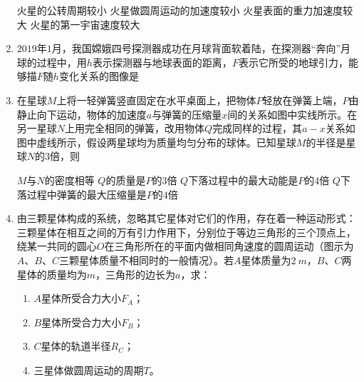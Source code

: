 \begin{enumerate}[leftmargin=0em]
\fourchoices
{火星的公转周期较小}
{火星做圆周运动的加速度较小}
{火星表面的重力加速度较大}
{火星的第一宇宙速度较大}
\item 
{}
$ 2019 $年$ 1 $月，我国嫦娥四号探测器成功在月球背面软着陆，在探测器“奔向”月球的过程中，用$ h $表示探测器与地球表面的距离，$ F $表示它所受的地球引力，能够描$ F $随$ h $变化关系的图像是  
\begin{figure}[h!]
\centering

\end{figure}

\item 
{}
在星球$ M $上将一轻弹簧竖直固定在水平桌面上，把物体$ P $轻放在弹簧上端，$ P $由静止向下运动，物体的加速度$ a $与弹簧的压缩量$ x $间的关系如图中实线所示。在另一星球$ N $上用完全相同的弹簧，改用物体$ Q $完成同样的过程，其$ a - x $关系如图中虚线所示，假设两星球均为质量均匀分布的球体。已知星球$ M $的半径是星球$ N $的$ 3 $倍，则  
\begin{figure}[h!]
\centering

\end{figure}


\fourchoices
{$ M $与$ N $的密度相等}
{$ Q $的质量是$ P $的$ 3 $倍}
{$ Q $下落过程中的最大动能是$ P $的$ 4 $倍}
{$ Q $下落过程中弹簧的最大压缩量是$ P $的$ 4 $倍}


\newpage
\item 
{}
由三颗星体构成的系统，忽略其它星体对它们的作用，存在着一种运动形式：三颗星体在相互之间的万有引力作用下，分别位于等边三角形的三个顶点上，绕某一共同的圆心$ O $在三角形所在的平面内做相同角速度的圆周运动（图示为$ A $、$ B $、$ C $三颗星体质量不相同时的一般情况）。若$ A $星体质量为$ 2 \ m $，$ B $、$ C $两星体的质量均为$ m $，三角形的边长为$ a $，求：
\begin{enumerate}
\renewcommand{\labelenumi}{\arabic{enumi}.}
\item
$ A $星体所受合力大小$ F_A $；
\item 
$ B $星体所受合力大小$ F_B $；
\item 
$ C $星体的轨道半径$ R_C $；
\item 
三星体做圆周运动的周期$ T $。
\end{enumerate}
\begin{figure}[h!]
\flushright

\end{figure}


\end{enumerate}
